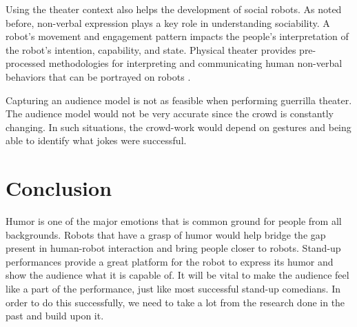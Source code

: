 Using the theater context also helps the development of social robots. As noted before, non-verbal expression plays a key role in understanding sociability. A robot's movement and engagement pattern impacts the people's interpretation of the robot's intention, capability, and state. Physical theater provides pre-processed methodologies for interpreting and communicating human non-verbal behaviors that can be portrayed on robots \cite{KnightEightLessons:2011}.

Capturing an audience model is not as feasible when performing guerrilla theater. The audience model would not be very accurate since the crowd is constantly changing. In such situations, the crowd-work would depend on gestures and being able to identify what jokes were successful.

\section{Conclusion}

Humor is one of the major emotions that is common ground for people from all backgrounds. Robots that have a grasp of humor would help bridge the gap present in human-robot interaction and bring people closer to robots. Stand-up performances provide a great platform for the robot to express its humor and show the audience what it is capable of. It will be vital to make the audience feel like a part of the performance, just like most successful stand-up comedians. In order to do this successfully, we need to take a lot from the research done in the past and build upon it.
